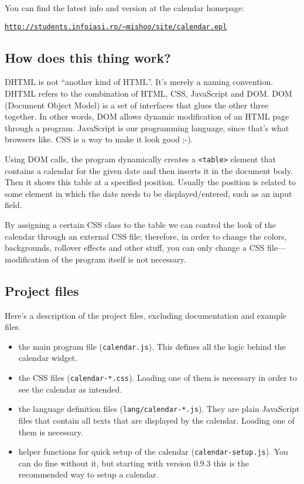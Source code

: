\documentclass[a4paper,10pt]{article}
\begin{document}
You can find the latest info and version at the calendar homepage:

\begin{center}
{\href{http://students.infoiasi.ro/~mishoo/site/calendar.epl}
{\texttt{http://students.infoiasi.ro/\~{}mishoo/site/calendar.epl}}}
\end{center}

\subsection{How does this thing work?}

DHTML is not ``another kind of HTML''.  It's merely a naming convention.  DHTML
refers to the combination of HTML, CSS, JavaScript and DOM.  DOM (Document
Object Model) is a set of interfaces that glues the other three together.  In
other words, DOM allows dynamic modification of an HTML page through a program.
JavaScript is our programming language, since that's what browsers like.  CSS
is a way to make it look good ;-).

Using DOM calls, the program dynamically creates a \texttt{<table>} element
that contains a calendar for the given date and then inserts it in the document
body.  Then it shows this table at a specified position.  Usually the position
is related to some element in which the date needs to be displayed/entered,
such as an input field.

By assigning a certain CSS class to the table we can control the look of the
calendar through an external CSS file; therefore, in order to change the
colors, backgrounds, rollover effects and other stuff, you can only change a
CSS file---modification of the program itself is not necessary.

\subsection{Project files}

Here's a description of the project files, excluding documentation and example
files.

\begin{itemize}

\item the main program file (\texttt{calendar.js}).  This defines all the logic
behind the calendar widget.

\item the CSS files (\texttt{calendar-*.css}).  Loading one of them is
necessary in order to see the calendar as intended.

\item the language definition files (\texttt{lang/calendar-*.js}).  They are
plain JavaScript files that contain all texts that are displayed by the
calendar.  Loading one of them is necessary.

\item helper functions for quick setup of the calendar
(\texttt{calendar-setup.js}).  You can do fine without it, but starting with
version 0.9.3 this is the recommended way to setup a calendar.

\end{itemize}
\end{document}
